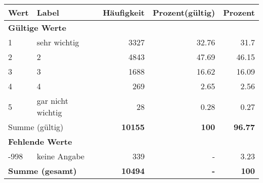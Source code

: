      \begin{longtable}{lXrrr}
     \toprule
     \textbf{Wert} & \textbf{Label} & \textbf{Häufigkeit} & \textbf{Prozent(gültig)} & \textbf{Prozent} \\
     \endhead
     \midrule
     \multicolumn{5}{l}{\textbf{Gültige Werte}}\\

     1 &
     \multicolumn{1}{X}{ sehr wichtig   } &


       \num{3327} &
       \num[round-mode=places,round-precision=2]{32,76} &
         \num[round-mode=places,round-precision=2]{31,7} \\

     2 &
     \multicolumn{1}{X}{ 2   } &


       \num{4843} &
       \num[round-mode=places,round-precision=2]{47,69} &
         \num[round-mode=places,round-precision=2]{46,15} \\

     3 &
     \multicolumn{1}{X}{ 3   } &


       \num{1688} &
       \num[round-mode=places,round-precision=2]{16,62} &
         \num[round-mode=places,round-precision=2]{16,09} \\

     4 &
     \multicolumn{1}{X}{ 4   } &


       \num{269} &
       \num[round-mode=places,round-precision=2]{2,65} &
         \num[round-mode=places,round-precision=2]{2,56} \\

     5 &
     \multicolumn{1}{X}{ gar nicht wichtig   } &


       \num{28} &
       \num[round-mode=places,round-precision=2]{0,28} &
         \num[round-mode=places,round-precision=2]{0,27} \\
     \midrule
     \multicolumn{2}{l}{Summe (gültig)} &
       \textbf{\num{10155}} &
     \textbf{100} &
       \textbf{\num[round-mode=places,round-precision=2]{96,77}} \\
     \multicolumn{5}{l}{\textbf{Fehlende Werte}}\\
       -998 &
       keine Angabe &
         \num{339} &
        - &
         \num[round-mode=places,round-precision=2]{3,23} \\
     \midrule
     \multicolumn{2}{l}{\textbf{Summe (gesamt)}} &
          \textbf{\num{10494}} &
        \textbf{-} &
        \textbf{100} \\
     \bottomrule
     \end{longtable}
     
